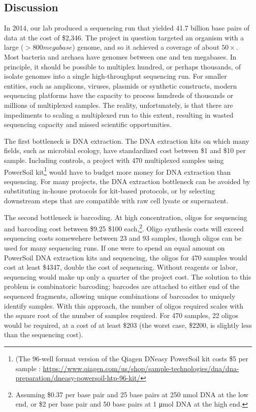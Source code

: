 \begin{refsection}
\section{Discussion}

In 2014, our lab produced a sequencing run that yielded 41.7 billion base pairs of data at the cost of \$2,346. The project in question targeted an organism with a large ($>800 megabase$) genome, and so it achieved a coverage of about $50\times$. Most bacteria and archaea have genomes between one and ten megabases. In principle, it should be possible to multiplex hundred, or perhaps thousands, of isolate genomes into a single high-throughput sequencing run. For smaller entities, such as amplicons, viruses, plasmids or synthetic constructs, modern sequencing platforms have the capacity to process hundreds of thousands or millions of multiplexed samples. The reality, unfortunately, is that there are impediments to scaling a multiplexed run to this extent, resulting in wasted sequencing capacity and missed scientific opportunities.

The first bottleneck is DNA extraction. The DNA extraction kits on which many fields, such as microbial ecology, have standardized cost between \$1 and \$10 per sample. Including controls, a project with 470 multiplexed samples using PowerSoil kit\footnote{(The 96-well format version of the Qiagen DNeasy PowerSoil kit costs \$5 per sample : \url{https://www.qiagen.com/us/shop/sample-technologies/dna/dna-preparation/dneasy-powersoil-htp-96-kit/}} would have to budget more money for DNA extraction than sequencing. For many projects, the DNA extraction bottleneck can be avoided by substituting in-house protocols for kit-based protocols, or by selecting downstream steps that are compatible with raw cell lysate or supernatent.

The second bottleneck is barcoding. At high concentration, oligos for sequencing and barcoding cost between \$9.25 \$100 each,\footnote{Assuming \$0.37 per base pair and 25 base pairs at 250 \si{\nano\mole} DNA at the low end, or \$2 per base pair and 50 base pairs at 1 \si{\micro\mole} DNA at the high end.}. Oligo synthesis costs will exceed sequencing costs somewehere between 23 and 93 samples, though oligos can be used for many sequencing runs. If one were to spend an equal amount on PowerSoil DNA extraction kits and sequencing, the oligos for 470 samples would cost at least \$4347, double the cost of sequencing. Without reagents or labor, sequencing would make up only a quarter of the project cost. The solution to this problem is combinatoric barcoding; barcodes are attached to either end of the sequenced fragments, allowing unique combinations of barcoades to uniquely identify samples. With this approach, the number of oligos required scales with the square root of the number of samples required. For 470 samples, 22 oligos would be required, at a cost of at least \$203 (the worst case, \$2200, is slightly less than the sequencing cost).


\end{refsection}
